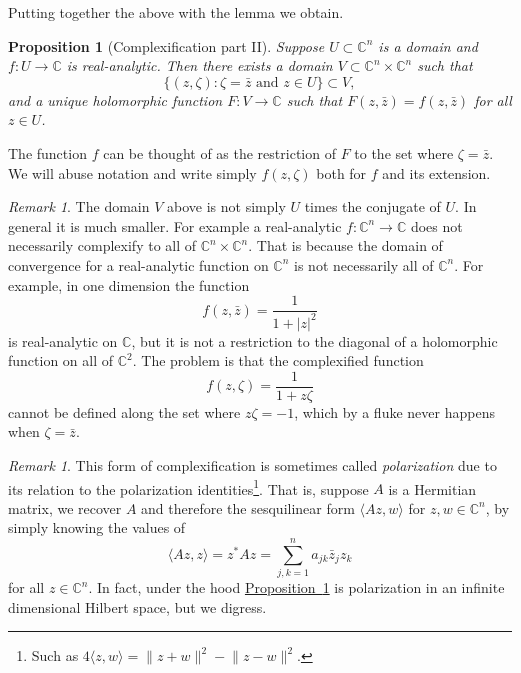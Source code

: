 \documentclass[12pt,openany]{book}
\newcommand{\linnprod}[2]{\langle #1 , #2 \rangle}
\newcommand{\sabs}[1]{\lvert {#1} \rvert}
\newcommand{\snorm}[1]{\lVert {#1} \rVert}
\newcommand{\C}{{\mathbb{C}}}
\newcommand{\myindex}[1]{#1\index{#1}}
\theoremstyle{plain}
\newtheorem{prop}[thm]{Proposition}
\theoremstyle{remark}
\newtheorem{remark}[thm]{Remark}
\theoremstyle{definition}
\theoremstyle{exercise}
\theoremstyle{example}
\newcommand{\propref}[1]{\hyperref[#1]{Proposition~\ref*{#1}}}
\begin{document}
Putting together the above with the lemma we obtain.

\begin{prop}[Complexification part II] \label{prop:complexificationpt2}
Suppose $U \subset \C^n$ is a domain and $f \colon U \to \C$ is
real-analytic.
Then there exists a domain $V \subset \C^n \times \C^n$ such that
\begin{equation*}
\bigl\{ (z,\zeta) : \zeta = \bar{z} \text{ and } z \in U \bigr\} \subset V ,
\end{equation*}
and a unique holomorphic function $F \colon V \to \C$ such that
$F(z,\bar{z}) = f(z,\bar{z})$ for all $z \in U$.
\end{prop}

The function $f$ can be thought of as the restriction of $F$ to the set
where $\zeta = \bar{z}$.  We will abuse notation and write
simply $f(z,\zeta)$ both for $f$ and its extension.

\begin{remark}
The domain $V$ above is not simply $U$ times the conjugate of $U$.  In
general it is much smaller.  For example a real-analytic $f \colon \C^n \to
\C$ does not necessarily complexify to all of $\C^n \times \C^n$.  That is
because the domain of convergence for a real-analytic function on $\C^n$
is not necessarily all of $\C^n$.  For example, in one dimension
the function
\begin{equation*}
f(z,\bar{z})
= \frac{1}{1+\sabs{z}^2}
\end{equation*}
is real-analytic on $\C$, but it is not a restriction to the diagonal
of a holomorphic function on all of $\C^2$.  The problem is that the complexified
function
\begin{equation*}
f(z,\zeta)
= \frac{1}{1+z \zeta}
\end{equation*}
cannot be defined along the set where $z \zeta = -1$, which by a fluke
never happens when $\zeta = \bar{z}$.
\end{remark}

\begin{remark}
This form of complexification is sometimes called
\emph{\myindex{polarization}} due to its relation to the polarization
identities\footnote{Such as $4 \linnprod{z}{w} =
\snorm{z+w}^2-\snorm{z-w}^2$.}.  That is, suppose $A$ is a Hermitian matrix, we 
recover $A$ and therefore the sesquilinear form $\linnprod{Az}{w}$ for
$z,w\in \C^n$, by simply knowing the values of
\begin{equation*}
\linnprod{Az}{z} = z^*Az = \sum_{j,k=1}^n a_{jk} \bar{z}_j z_k 
\end{equation*}
for all $z \in \C^n$.  In fact, under the hood \propref{prop:complexificationpt2} is
polarization in an infinite
dimensional Hilbert space, but we digress.
\end{remark}
\end{document}
